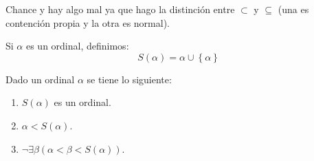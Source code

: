 \documentclass[12pt]{report}
\newcounter{it}
\theoremstyle{largebreak}
\begin{document}
    \begin{obs}
        Chance y hay algo mal ya que hago la distinción entre $\subset$ y $\subseteq$ (una es contención propia y la otra es normal).
    \end{obs}

    \begin{mydef}
        Si $\alpha$ es un ordinal, definimos:
        \begin{equation*}
            S(\alpha)=\alpha\cup\left\{\alpha\right\}
        \end{equation*}
    \end{mydef}

    \begin{theor}
        Dado un ordinal $\alpha$ se tiene lo siguiente:
        \begin{enumerate}[label = \textit{(\arabic*)}]
            \item $S(\alpha)$ es un ordinal.
            \item $\alpha<S(\alpha)$.
            \item $\neg\exists\beta(\alpha<\beta<S(\alpha))$.
        \end{enumerate}
    \end{theor}
\end{document}

